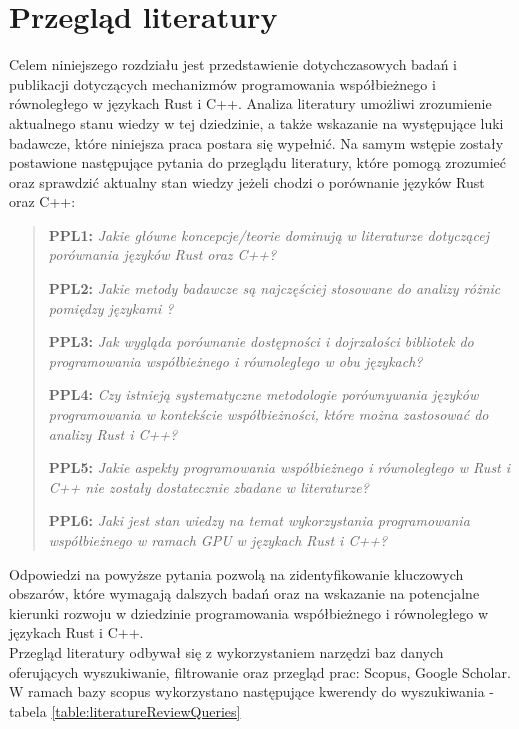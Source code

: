 \chapter{Przegląd literatury}
Celem niniejszego rozdziału jest przedstawienie dotychczasowych badań i publikacji dotyczących mechanizmów programowania współbieżnego i równoległego w językach Rust i C++. Analiza literatury umożliwi zrozumienie aktualnego stanu wiedzy w tej dziedzinie, a także wskazanie na występujące luki badawcze, które niniejsza praca postara się wypełnić.
Na samym wstępie zostały postawione następujące pytania do przeglądu literatury, które pomogą zrozumieć oraz sprawdzić aktualny stan wiedzy jeżeli chodzi o porównanie języków Rust oraz C++:

\begin{quote}
    \item \textbf{PPL1:} \emph{Jakie główne koncepcje/teorie dominują w literaturze dotyczącej porównania języków Rust oraz C++?}
    \item \textbf{PPL2:} \emph{Jakie metody badawcze są najczęściej stosowane do analizy różnic pomiędzy językami ?}
    \item \textbf{PPL3:} \emph{Jak wygląda porównanie dostępności i dojrzałości bibliotek do programowania współbieżnego i równoległego w obu językach?}
    \item \textbf{PPL4:} \emph{Czy istnieją systematyczne metodologie porównywania języków programowania w kontekście współbieżności, które można zastosować do analizy Rust i C++?}
    \item \textbf{PPL5:} \emph{Jakie aspekty programowania współbieżnego i równoległego w Rust i C++ nie zostały dostatecznie zbadane w literaturze?}
    \item \textbf{PPL6:} \emph{Jaki jest stan wiedzy na temat wykorzystania programowania współbieżnego w ramach GPU w językach Rust i C++?}
\end{quote}

Odpowiedzi na powyższe pytania pozwolą na zidentyfikowanie kluczowych obszarów, które wymagają dalszych badań oraz na wskazanie na potencjalne kierunki rozwoju w dziedzinie programowania współbieżnego i równoległego w językach Rust i C++.\\
Przegląd literatury odbywał się z wykorzystaniem narzędzi baz danych oferujących wyszukiwanie, filtrowanie oraz przegląd prac: Scopus, Google Scholar.\\
W ramach bazy scopus wykorzystano następujące kwerendy do wyszukiwania - tabela \ref{table:literatureReviewQueries}

